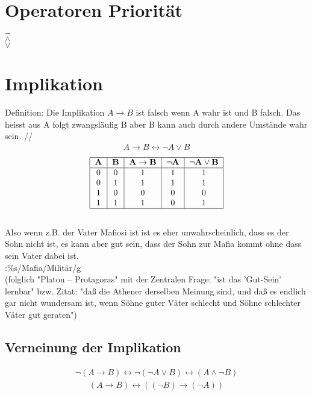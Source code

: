 \documentclass[a4paper]{scrartcl}
\begin{document}
\section{Operatoren Priorität}
$\neg$ \\
$\wedge$ \\
$\vee$ \\

\section{Implikation}
Definition: Die Implikation $A \rightarrow B$ ist falsch wenn A wahr ist und B falsch. Das heisst aus A folgt zwangsläufig B aber B kann auch durch andere Umstände wahr sein. //
\begin{align}
\boxed{A \rightarrow B  \leftrightarrow \neg A \vee B }
\end{align}
\begin{align}
\begin{tabular}{|c|c|c|c|c|}
\hline
\textbf{A} & \textbf{B} & $\bf{A \rightarrow B }$ & $ \bf{\neg A} $ & $ \bf{\neg A \vee B} $ \\
\hline
0&0&1&1&1 \\
0&1&1&1&1 \\
1&0&0&0&0 \\
1&1&1&0&1 \\
\hline
\end{tabular}
\end{align} \\
Also wenn z.B. der Vater Mafiosi ist ist es eher unwahrscheinlich, dass es der Sohn nicht ist, es kann aber gut sein, dass der Sohn zur Mafia kommt ohne dass sein Vater dabei ist. \\
:\%s/Mafia/Militär/g \\
(folglich "Platon -- Protagoras" mit der Zentralen Frage: "ist das 'Gut-Sein' lernbar" bzw. Zitat: "daß die Athener derselben Meinung sind, und daß es endlich gar nicht wundersam ist, wenn Söhne guter Väter schlecht und Söhne schlechter Väter gut geraten") \\

\subsection{Verneinung der Implikation}
\begin{align*}
\boxed{\neg (A \rightarrow B) \leftrightarrow \neg (\neg A \vee B) \leftrightarrow (A \wedge \neg B) }
\end{align*}
\begin{align}
\boxed{
(A \rightarrow B) \leftrightarrow ((\neg B) \rightarrow (\neg A)) 
}
\end{align}
\end{document}
